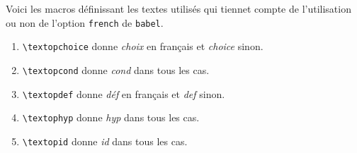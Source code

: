 \documentclass[12pt,a4paper]{article}
\begin{document}
Voici les macros définissant les textes utilisés qui tiennet compte de l'utilisation ou non de l'option \verb+french+ de \verb+babel+.

\begin{enumerate}
	\item \verb+\textopchoice+ donne \emph{\og choix \fg} en français et \emph{\og choice \fg} sinon.

	\item \verb+\textopcond+ donne \emph{\og cond \fg} dans tous les cas.

	\item \verb+\textopdef+ donne \emph{\og déf \fg} en français et \emph{\og def \fg} sinon.

	\item \verb+\textophyp+ donne \emph{\og hyp \fg} dans tous les cas.

	\item \verb+\textopid+ donne \emph{\og id \fg} dans tous les cas.
\end{enumerate}
\end{document}

